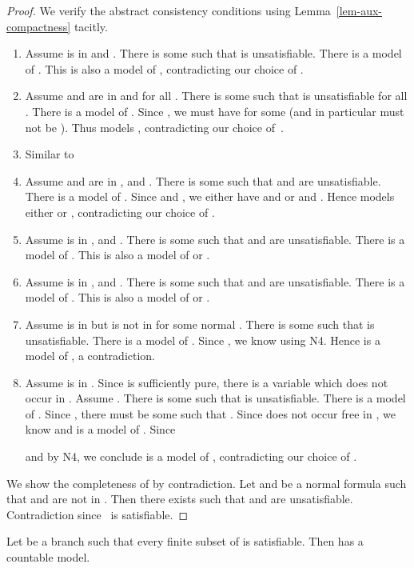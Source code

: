 \begin{proof}
  We verify the abstract consistency conditions using
  Lemma~\ref{lem-aux-compactness} tacitly.
\begin{enumerate}[\AMat]
\item[{\ADN}] Assume  is in  and
  .  There is some
   such that  is
  unsatisfiable.  There is a model of
  .
  This is also a model of
  , contradicting our choice of .
\item[{\AMat}] Assume  and  are in  and  for all .
  There is some  such that
   is unsatisfiable for all
  .  There is a model  of
  .
  Since , we must have 
  for some  (and in particular  must not be ).  Thus  models
  , contradicting our choice
  of~.
\item[{\ADec}] Similar to  \item[{\ACon}] Assume  and 
  are in ,  and .  There is some 
  such that  and
   are unsatisfiable.  There
  is a model  of .  Since 
  and , we either have
   and  or  and
  .  Hence  models
  either  or , contradicting our choice of .
\item[{\ABQ}] Assume  is in ,
   and .  There is some  such that  and  are unsatisfiable.  There is a model of
  .  This is also a
  model of  or .
\item[{\ABE}] Assume  is in ,
   and .  There is some  such that  and  are unsatisfiable.  There is a model of
  .  This is also a
  model of  or .
\item[{\AFQ}] Assume  is in 
  but  is not in
   for some normal .
  There is some  such that
   is unsatisfiable.  There
  is a model  of .
  Since , we know
   using N4.  Hence
   is a model of , a
  contradiction.  
\item[{\AFE}] Assume  is in .
  Since  is sufficiently pure, there is a variable
   which does not occur in .  Assume
  .  There
  is some  such that
   is unsatisfiable.
  There is a model  of .  Since
  , there must be some
   such that
  .  Since  does not
  occur free in , we know
   and
   is a model of .  Since
  
  and  by N4, we
  conclude  is a model of
  , contradicting our
  choice of .
\end{enumerate}
We show the completeness of 
by contradiction.  Let  and  be a
normal formula such that  and
 are not in .  Then
there exists  such that
 and  are
unsatisfiable.  Contradiction since~ is
satisfiable.
\end{proof}

\begin{thm}\label{thm:compactness-ls}
  Let  be a branch such that every finite subset of
   is satisfiable.  Then  has a countable model.
\end{thm}

